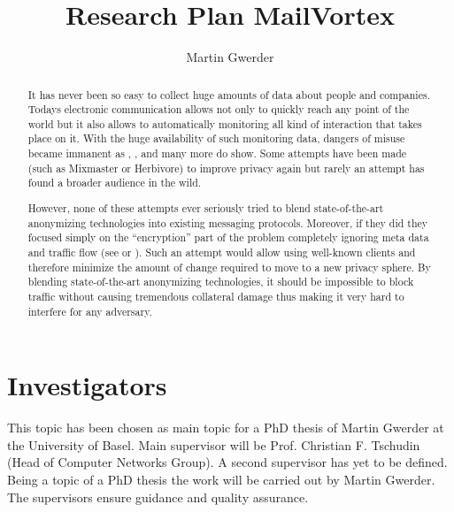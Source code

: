 \documentclass[twocolumn,a4paper,10pt,english]{scrartcl}
\begin{document}
\title{Research Plan MailVortex}
\author{Martin Gwerder}
\date{\SVNDate}

\maketitle

\begin{abstract}It has never been so easy to collect huge amounts of data about people and companies. Todays electronic communication allows not only to quickly reach any point of the world but it also allows to automatically monitoring all kind of interaction that takes place on it. With the huge availability of such monitoring data, dangers of misuse became immanent as \cite{ECHELON}, \cite{wiki:prism}, \cite{wiki:tempora} and many more do show. Some attempts have been made (such as Mixmaster\cite{mixmaster-spec} or Herbivore\cite{herbivore:tr}) to improve privacy again but rarely an attempt has found a broader audience in the wild. \par

However, none of these attempts ever seriously tried to blend state-of-the-art anonymizing technologies into existing messaging protocols. Moreover, if they did they focused simply on the ``encryption'' part of the problem completely ignoring meta data and traffic flow (see \cite{RFC3851} or \cite{RFC2015}). Such an attempt  would allow using well-known clients and therefore minimize the amount of change required to move to a new privacy sphere. By blending state-of-the-art anonymizing technologies, it should be impossible to block traffic without causing tremendous collateral damage thus making it very hard to interfere for any adversary. 
\end{abstract}

\section{Investigators}
This topic has been chosen as main topic for a PhD thesis of Martin Gwerder at the University of Basel. Main supervisor will be Prof. Christian F. Tschudin (Head of Computer Networks Group). A second supervisor has yet to be defined. Being a topic of a PhD thesis the work will be carried out by Martin Gwerder. The supervisors ensure guidance and quality assurance.
\end{document}
